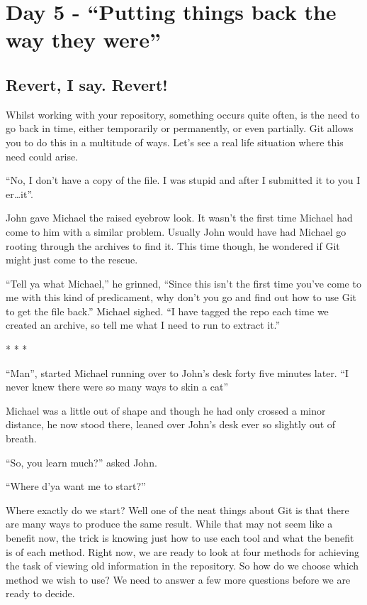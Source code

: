 \section{Day 5 - ``Putting things back the way they were''}
\subsection{Revert, I say.  Revert!}

Whilst working with your repository, something occurs quite often, is the need to go back in time, either temporarily or permanently, or even partially.  Git allows you to do this in a multitude of ways.  Let's see a real life situation where this need could arise.

\begin{trenches}
``No, I don't have a copy of the file.  I was stupid and after I submitted it to you I er\ldots\deleted it''.  

John gave Michael the raised eyebrow look.  It wasn't the first time Michael had come to him with a similar problem.  Usually John would have had Michael go rooting through the archives to find it.  This time though, he wondered if Git might just come to the rescue.

``Tell ya what Michael,'' he grinned, ``Since this isn't the first time you've come to me with this kind of predicament, why don't you go and find out how to use Git to get the file back.''  Michael sighed.  ``I have tagged the repo each time we created an archive, so tell me what I need to run to extract it.''

\begin{center} * * * \end{center}

``Man'', started Michael running over to John's desk forty five minutes later.  ``I never knew there were so many ways to skin a cat''

Michael was a little out of shape and though he had only crossed a minor distance, he now stood there, leaned over John's desk ever so slightly out of breath.

``So, you learn much?'' asked John.

``Where d'ya want me to start?''

\end{trenches}

Where exactly do we start?  Well one of the neat things about Git is that there are many ways to produce the same result.  While that may not seem like a benefit now, the trick is knowing just how to use each tool and what the benefit is of each method.  Right now, we are ready to look at four methods for achieving the task of viewing old information in the repository.  So how do we choose which method we wish to use?  We need to answer a few more questions before we are ready to decide.

